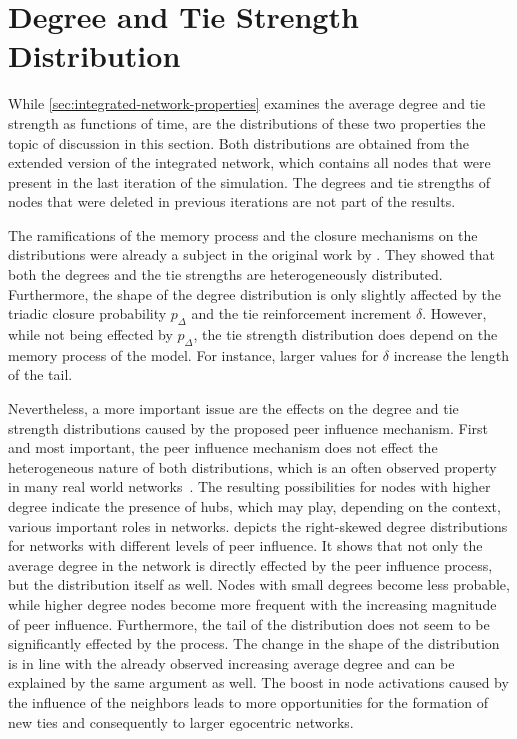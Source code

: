

\section{Degree and Tie Strength Distribution}
\label{sec:weight-and-degree-distribution}

While \cref{sec:integrated-network-properties} examines the average degree and tie strength as functions of time, are the distributions of these two properties the topic of discussion in this section.
Both distributions are obtained from the extended version of the integrated network, which contains all nodes that were present in the last iteration of the simulation.
The degrees and tie strengths of nodes that were deleted in previous iterations are not part of the results.

The ramifications of the memory process and the closure mechanisms on the distributions were already a subject in the original work by \citet{Laurent2015}.
They showed that both the degrees and the tie strengths are heterogeneously distributed.
Furthermore, the shape of the degree distribution is only slightly affected by the triadic closure probability \( p_{\Delta} \) and the tie reinforcement increment \( \delta \).
However, while not being effected by \( p_{\Delta} \), the tie strength distribution does depend on the memory process of the model.
For instance, larger values for \( \delta \) increase the length of the tail.

Nevertheless, a more important issue are the effects on the degree and tie strength distributions caused by the proposed peer influence mechanism.
First and most important, the peer influence mechanism does not effect the heterogeneous nature of both distributions, which is an often observed property in many real world networks~\cite{Barabasi2002, Karsai2014}.
The resulting possibilities for nodes with higher degree indicate the presence of hubs, which may play, depending on the context, various important roles in networks.
 depicts the right-skewed degree distributions for networks with different levels of peer influence.
It shows that not only the average degree in the network is directly effected by the peer influence process, but the distribution itself as well.
Nodes with small degrees become less probable, while higher degree nodes become more frequent with the increasing magnitude of peer influence.
Furthermore, the tail of the distribution does not seem to be significantly effected by the process.
The change in the shape of the distribution is in line with the already observed increasing average degree and can be explained by the same argument as well.
The boost in node activations caused by the influence of the neighbors leads to more opportunities for the formation of new ties and consequently to larger egocentric networks.


